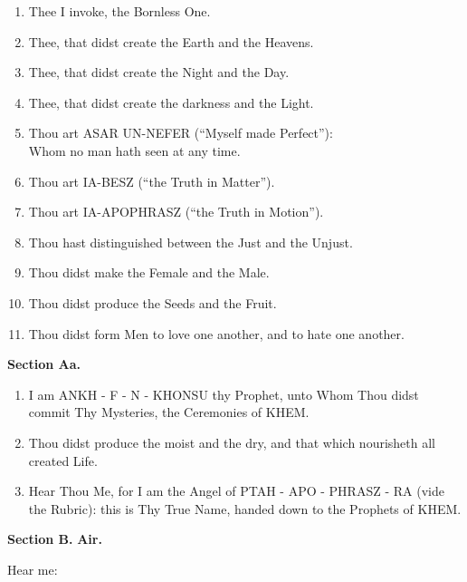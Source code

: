 \begin{enumerate}
\item Thee I invoke, the Bornless One.
\item Thee, that didst create the Earth and the Heavens.
\item Thee, that didst create the Night and the Day.
\item Thee, that didst create the darkness and the Light.
\item Thou art ASAR UN-NEFER (\enquote{Myself made Perfect}): \\
Whom no man hath seen at any time.
\item Thou art IA-BESZ (\enquote{the Truth in Matter}).
\item Thou art IA-APOPHRASZ (\enquote{the Truth in Motion}).
\item Thou hast distinguished between the Just and the Unjust.
\item Thou didst make the Female and the Male.
\item Thou didst produce the Seeds and the Fruit.
\item Thou didst form Men to love one another, and to hate one another.
\end{enumerate}

\textbf{Section Aa.}

\begin{enumerate}
\item I am ANKH - F - N - KHONSU thy Prophet, unto Whom Thou didst commit Thy Mysteries, the Ceremonies of KHEM.
\item Thou didst produce the moist and the dry, and that which nourisheth all created Life.
\item Hear Thou Me, for I am the Angel of PTAH - APO - PHRASZ - RA (vide the Rubric): this is Thy True Name, handed down to the Prophets of KHEM.
\end{enumerate}

\textbf{Section B.} \hfill \textbf{Air.}

Hear me: \textemdash{}



